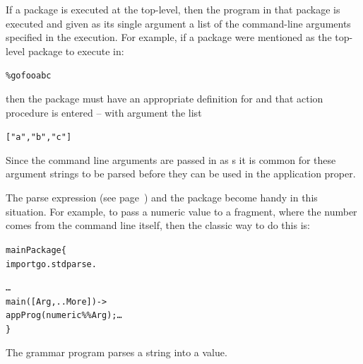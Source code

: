 If a package is executed at the top-level, then the  program in that package is executed and given as its single argument a list of the command-line arguments specified in the execution. For example, if a package  were mentioned as the top-level package to execute in:
\begin{alltt}
\% go foo a b c
\end{alltt}
then the package  must have an appropriate definition for  and that action procedure is entered -- with argument the list
\begin{alltt}["a","b","c"]\end{alltt}
\begin{aside}
Since the command line arguments are passed in as s it is common for these argument strings to be parsed before they can be used in the application proper.  

The \q{\%\%} parse expression (see page~\pageref{expression:grammarexp}) and the  package become handy in this situation. For example, to pass a numeric value to a \go fragment, where the number comes from the command line itself, then the classic way to do this is:
\begin{alltt}
mainPackage\{
  import go.stdparse.
  
  \ldots
  main([Arg,..More]) ->
    appProg(numeric\%\%Arg);\ldots
\}
\end{alltt}
The  grammar program parses a string into a  value.
\end{aside}

